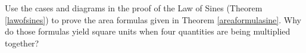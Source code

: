 { Use the cases and diagrams in the proof of the Law of Sines (Theorem \ref{lawofsines}) to prove the area formulas given in Theorem \ref{areaformulasine}.  Why do those formulas yield square units when four quantities are being multiplied together?}
{}
